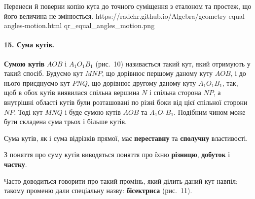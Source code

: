%
{Перенеси й поверни копію кута до точного суміщення з еталоном та простеж, що його величина не змінюється.}%
{https://radchr.github.io/Algebra/geometry-equal-angles-motion.html}%
{qr_equal_angles_motion.png}

\paragraph{15. Сума кутів.}
\textbf{Сумою кутів} $AOB$ і $A_1O_1B_1$ (рис.~10) називається такий кут, який отримують у такий спосіб. Будуємо кут $MNP$, що дорівнює першому даному куту $AOB$, і до нього приєднуємо кут $PNQ$, що дорівнює другому даному куту $A_1O_1B_1$, так, щоб в обох кутів виявилася спільна вершина $N$ і спільна сторона $NP$, а внутрішні області кутів були розташовані по різні боки від цієї спільної сторони $NP$. Тоді кут $MNQ$ і буде сумою кутів $AOB$ та $A_1O_1B_1$. Подібним чином може бути складена сума трьох і більше кутів.

\begin{center}
\end{center}

Сума кутів, як і сума відрізків прямої, має \textbf{переставну} та \textbf{сполучну} властивості.

З поняття про суму кутів виводяться поняття про їхню \textbf{різницю}, \textbf{добуток} і \textbf{частку}.

Часто доводиться говорити про такий промінь, який ділить даний кут навпіл; такому променю дали спеціальну назву: \textbf{бісектриса} (рис.~11).

